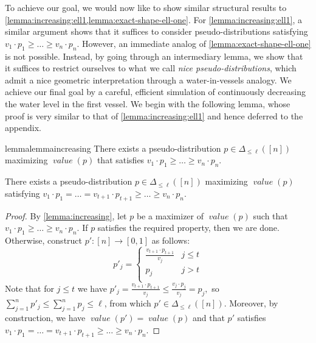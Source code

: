\documentclass[sigconf,nonacm]{aamas}
\DeclareMathOperator{\valueText}{\textit{value}}
\newcommand{\val}[1]{\valueText({#1})}
\begin{document}
To achieve our goal, we would now like to show similar structural results to \cref{lemma:increasing:ell1,lemma:exact-shape-ell-one}. For \cref{lemma:increasing:ell1}, a similar argument shows that it suffices to consider pseudo-distributions satisfying $v_1 \cdot p_1 \geq \dots \geq v_n \cdot p_n$. However, an immediate analog of \cref{lemma:exact-shape-ell-one} is not possible. Instead, by going through an intermediary lemma, we show that it suffices to restrict ourselves to what we call \emph{nice pseudo-distributions}, which admit a nice geometric interpretation through a water-in-vessels analogy. 
We achieve our final goal by a careful, efficient simulation of continuously decreasing the water level in the first vessel. We begin with the following lemma, whose proof is very similar to that of \cref{lemma:increasing:ell1} and hence deferred to the appendix.

\begin{restatable}{lemma}{lemmaincreasing}\label{lemma:increasing} There exists a pseudo-distribution $p \in \Delta_{\leq \ell}([n])$ maximizing $\val{p}$ that satisfies $v_1 \cdot p_1 \geq \dots \geq v_n \cdot p_n.$
\end{restatable}

\begin{lemma}\label{lemma:increasing-with-equalities} There exists a pseudo-distribution $p \in \Delta_{\leq \ell}([n])$ maximizing $\val{p}$ satisfying $v_1 \cdot p_1 = \dots = v_{t + 1} \cdot p_{t + 1} \geq \dots \geq v_n \cdot p_n.$
\end{lemma}
\begin{proof} 
By \cref{lemma:increasing}, let $p$ be a maximizer of $\val{p}$ such that $v_1 \cdot p_1 \geq \dots \geq v_n \cdot p_n.$ If $p$ satisfies the required property, then we are done. Otherwise, construct $p' : [n] \to [0, 1]$ as follows:
%
\begin{equation*}
    p'_j = \left\{
    \begin{array}{ll}
          \frac{v_{t + 1} \cdot p_{t + 1}}{v_j} & j \leq t \\
          p_j & j > t \\
    \end{array}
    \right.
\end{equation*}
Note that for $j \leq t$ we have $p'_j = \frac{v_{t + 1} \cdot p_{t + 1}}{v_j} \leq \frac{v_j \cdot p_j}{v_j} = p_j,$ so $\sum_{j = 1}^{n}p'_j \leq \sum_{j = 1}^{n}p_j \leq \ell$, from which $p' \in \Delta_{\leq \ell}([n])$. Moreover, by construction, we have $\val{p'} = \val{p}$ and that $p'$ satisfies $v_1 \cdot p_1 = \dots = v_{t + 1} \cdot p_{t + 1} \geq \dots \geq v_n \cdot p_n$.
\end{proof}
\end{document}
